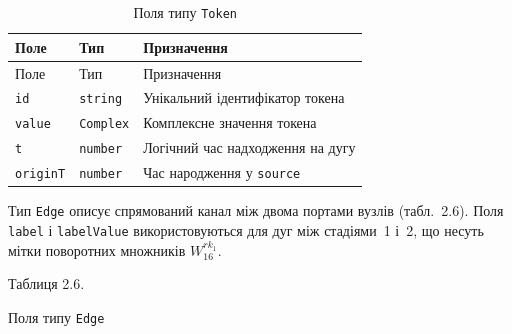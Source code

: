 \begin{longtable}[]{@{}
  >{\raggedright\arraybackslash}p{}
  >{\raggedright\arraybackslash}p{}
  >{\raggedright\arraybackslash}p{}@{}}
\caption[Поля типу Token]{Поля типу \texttt{Token}}\tabularnewline
\toprule\noalign{}
\begin{minipage}[b]{\linewidth}\raggedright
Поле
\end{minipage} & \begin{minipage}[b]{\linewidth}\raggedright
Тип
\end{minipage} & \begin{minipage}[b]{\linewidth}\raggedright
Призначення
\end{minipage} \\
\midrule\noalign{}
\endfirsthead
\toprule\noalign{}
\begin{minipage}[b]{\linewidth}\raggedright
Поле
\end{minipage} & \begin{minipage}[b]{\linewidth}\raggedright
Тип
\end{minipage} & \begin{minipage}[b]{\linewidth}\raggedright
Призначення
\end{minipage} \\
\midrule\noalign{}
\endhead
\bottomrule\noalign{}
\endlastfoot
\texttt{id} & \texttt{string} & Унікальний ідентифікатор токена \\
\texttt{value} & \texttt{Complex} & Комплексне значення токена \\
\texttt{t} & \texttt{number} & Логічний час надходження на дугу \\
\texttt{originT} & \texttt{number} & Час народження у \texttt{source} \\
\end{longtable}

Тип \texttt{Edge} описує спрямований канал між двома портами вузлів
(табл.~2.6). Поля \texttt{label} і \texttt{labelValue} використовуються
для дуг між стадіями~1 і~2, що несуть мітки поворотних множників
\(W_{16}^{rk_{1}}\).

Таблиця 2.6.

Поля типу \texttt{Edge}

